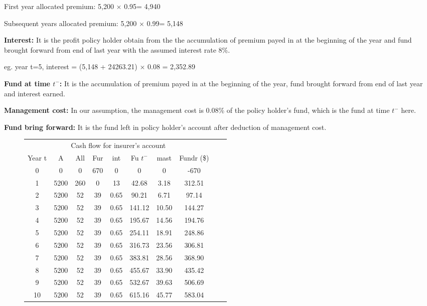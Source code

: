 \documentclass{report}
\begin{document}
First year allocated premium:                5,200 $\times$ 0.95= 4,940

Subsequent years allocated premium:   5,200 $\times$ 0.99= 5,148

\textbf{Interest:} It is the profit policy holder obtain from the the accumulation of premium payed in at the beginning of the year and fund brought forward from end of last year with the assumed interest rate 8\%.

eg.  year t=5, interest = (5,148 + 24263.21) $\times$ 0.08 = 2,352.89

\textbf{Fund at time $t^-$:} It is the accumulation of premium payed in at the beginning of the year, fund brought forward from end of last year and interest earned.

\textbf{Management cost:} In our assumption, the management cost is 0.08\% of the policy holder's fund, which is the fund at time $t^-$ here. 

\textbf{Fund bring forward:} It is the fund left in policy holder's account after deduction of management cost. 




\begin{figure}[ht]
\hfill
\begin{tabular}{c c c c c c c c c c}
\toprule
\multicolumn{8}{c}{Cash flow for insurer's account} \\
\cmidrule(r){3-7}

Year t & A & All & Fur & int & Fu $t^-$ & mast & Fundr (\$) \\
\midrule

0&0&0&670&0&0&0&-670\\
1&5200&260&0&13&42.68&3.18&312.51\\
2&5200&52&39&0.65&90.21&6.71&97.14\\
3&5200&52&39&0.65&141.12&10.50&144.27\\
4&5200&52&39&0.65&195.67&14.56&194.76\\
5&5200&52&39&0.65&254.11&18.91&248.86\\
6&5200&52&39&0.65&316.73&23.56&306.81\\
7&5200&52&39&0.65&383.81&28.56&368.90\\
8&5200&52&39&0.65&455.67&33.90&435.42\\
9&5200&52&39&0.65&532.67&39.63&506.69\\
10&5200&52&39&0.65&615.16&45.77&583.04\\

\bottomrule
\end{tabular}
\end{figure}
\end{document}
